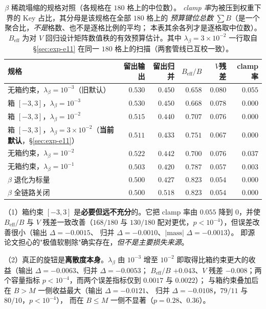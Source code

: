 \begin{table}[t]
  \centering
  \footnotesize
  \setlength{\tabcolsep}{3pt}
  \begin{tabular}{p{}rrrrr}
    \toprule
    规格 & 留出输出 & 留出归并 & $B_{\text{eff}}/B$ & $V$残差 & clamp率 \\
    \midrule
    无箱约束，$\lambda_\beta{=}10^{-3}$（旧默认）
        & $0.530$ & $0.450$ & $0.658$ & $0.080$ & $0.055$ \\
    箱 $[-3,3]$，$\lambda_\beta{=}10^{-3}$
        & $0.530$ & $0.450$ & $0.668$ & $0.078$ & $\mathbf{0.000}$ \\
    箱 $[-3,3]$，$\lambda_\beta{=}10^{-2}$
        & $0.515$ & $0.440$ & $0.707$ & $0.076$ & $\mathbf{0.000}$ \\
    箱 $[-3,3]$，$\lambda_\beta{=}3{\times}10^{-2}$（\textbf{当前默认}，\S\ref{sec:exp-e11}）
        & $0.511$ & $0.433$ & $0.751$ & $0.067$ & $\mathbf{0.000}$ \\
    无箱约束，$\lambda_\beta{=}10^{-2}$
        & $0.522$ & $0.442$ & $0.700$ & $0.076$ & $0.037$ \\
    无箱约束，$\lambda_\beta{=}10^{-1}$
        & $0.503$ & $0.420$ & $0.787$ & $0.057$ & $0.003$ \\
    \midrule
    $\beta$ 退化为标量
        & $0.500$ & $0.427$ & $0.823$ & $0.054$ & $0.000$ \\
    $\beta$ 全链路关闭
        & $0.500$ & $0.518$ & $0.823$ & $0.054$ & $0.000$ \\
    \bottomrule
  \end{tabular}
  \caption{$\beta$ 稀疏塌缩的规格对照（各规格在 $180$ 格上的中位数）。
  \emph{clamp 率}为被压到权重下界的 Key 占比，其分母是该规格在全部 $180$ 格上的
  \emph{预算键位总数} $\sum B$（是一个聚合比，\emph{不是}格数、也不是逐格比例的平均；
  本表其余各列才是逐格取中位数）。$B_{\text{eff}}$ 为对
  $V$ 回归设计矩阵数值秩的有效预算估计。其中 $\lambda_\beta=3\times10^{-2}$
  一行取自 \S\ref{sec:exp-e11} 在同一 $180$ 格上的扫描（两套管线已互校一致）。}
  \label{tab:beta-collapse}
\end{table}

（1）箱约束 $[-3,3]$ 是\textbf{必要但远不充分}的。它把 clamp 率由 $0.055$
降到 $0$，并使 $B_{\text{eff}}/B$ 与 $V$ 残差一致改善（$168/180$ 与 $130/180$
配对更优，$p<10^{-4}$），但误差改善很小（输出 $\Delta=-0.0015$、
归并 $\Delta=-0.0010$、$|\text{mass}|$ $\Delta=-0.0013$）。
即源论文担心的"极值软剔除"确实存在，\emph{但不是主要损失来源}。

（2）真正的旋钮是\textbf{离散度本身}。$\lambda_\beta$ 由 $10^{-3}$ 增至 $10^{-2}$
即取得比箱约束更大的收益（输出 $\Delta=-0.0063$、归并 $\Delta=-0.0053$；
$B_{\text{eff}}/B$ $+0.043$、$V$ 残差 $-0.008$；两个容量指标 $p<10^{-4}$，而两个误差指标仅到 $0.0017$ 与 $0.0022$）；
与箱约束叠加后在 $B>M$ 一侧收益最大（输出 $\Delta=-0.0121$、
归并 $\Delta=-0.0108$，$79/11$ 与 $80/10$，$p<10^{-4}$），
而在 $B\le M$ 一侧不显著（$p=0.28$、$0.36$）。


